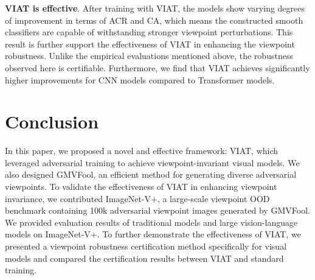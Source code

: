 \documentclass[10pt,journal,compsoc]{IEEEtran}
\begin{document}
\noindent \textbf{VIAT is effective}. After training with VIAT, the models show varying degrees of improvement in terms of ACR and CA, which means the constructed smooth classifiers are capable of withstanding stronger viewpoint perturbations. This result is further support the effectiveness of VIAT in enhancing the viewpoint robustness.  Unlike the empirical evaluations mentioned above, the robustness observed here is certifiable. Furthermore, we find that VIAT achieves significantly higher improvements for CNN models compared to Transformer models.
\label{sec:Certification} 




\section{Conclusion}
\label{sec:5}
In this paper, we proposed a novel and effective framework: VIAT, which leveraged adversarial training to achieve viewpoint-invariant visual models. We also designed GMVFool, an efficient method for generating diverse adversarial viewpoints. To validate the effectiveness of VIAT in enhancing viewpoint invariance, we contributed ImageNet-V+, a large-scale viewpoint OOD benchmark containing 100k adversarial viewpoint images generated by GMVFool. We provided evaluation results of traditional models and large vision-language models on ImageNet-V+. To further demonstrate the effectiveness of VIAT, we presented a viewpoint robustness certification method specifically for visual models and compared the certification results between VIAT and standard training.







\end{document}
